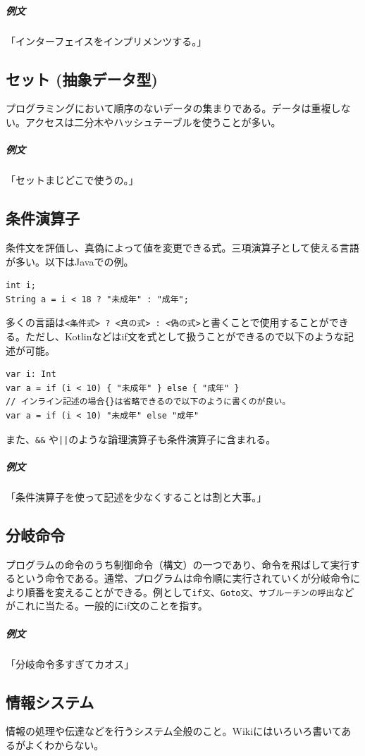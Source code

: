 \documentclass[dvipdfmx,jb5]{jreport}
\newcommand{\terlogy}[2][|]{\colorbox{terlogy}{\texttt{\lstinline#1#2#1}}}
\begin{document}
\subparagraph{例文}「インターフェイスをインプリメンツする。」

\subsection{セット (抽象データ型)}
プログラミングにおいて順序のないデータの集まりである。データは重複しない。アクセスは二分木やハッシュテーブルを使うことが多い。

\subparagraph{例文}「セットまじどこで使うの。」

\subsection{条件演算子}
条件文を評価し、真偽によって値を変更できる式。三項演算子として使える言語が多い。以下はJavaでの例。

\lstset{language=Java}
\begin{lstlisting}
int i;
String a = i < 18 ? "未成年" : "成年";
\end{lstlisting}

多くの言語は\terlogy{<条件式> ? <真の式> : <偽の式>}と書くことで使用することができる。ただし、Kotlinなどはif文を式として扱うことができるので以下のような記述が可能。

\lstset{language=Kotlin}
\begin{lstlisting}
var i: Int
var a = if (i < 10) { "未成年" } else { "成年" }
// インライン記述の場合{}は省略できるので以下のように書くのが良い。
var a = if (i < 10) "未成年" else "成年"
\end{lstlisting}

また、\terlogy{&&}  や\terlogy{||}のような論理演算子も条件演算子に含まれる。

\subparagraph{例文}「条件演算子を使って記述を少なくすることは割と大事。」

\subsection{分岐命令}
プログラムの命令のうち制御命令（構文）の一つであり、命令を飛ばして実行するという命令である。通常、プログラムは命令順に実行されていくが分岐命令により順番を変えることができる。例として\terlogy{if文}、\terlogy{Goto文}、\terlogy{サブルーチンの呼出}などがこれに当たる。一般的にif文のことを指す。

\subparagraph{例文}「分岐命令多すぎてカオス」

\subsection{情報システム}
情報の処理や伝達などを行うシステム全般のこと。Wikiにはいろいろ書いてあるがよくわからない。
\end{document}
